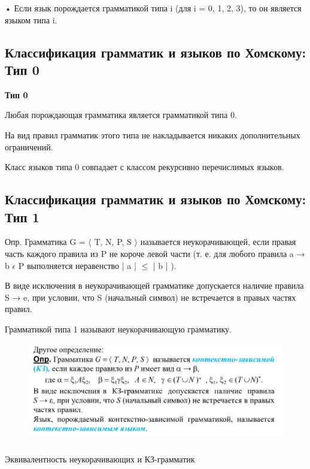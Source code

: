 \documentclass{article}
\begin{document}
• Если язык порождается грамматикой типа i (для i = 0, 1, 2,
3), то он является языком типа i.

\subsection{Классификация грамматик и языков по
Хомскому: Тип 0}

\textbf{Тип 0}

Любая порождающая грамматика является грамматикой
типа 0.

На вид правил грамматик этого типа не накладывается
никаких дополнительных ограничений.

Класс языков типа 0 совпадает с классом рекурсивно
перечислимых языков.

\subsection{Классификация грамматик и языков по
Хомскому: Тип 1}

Опр. Грамматика G = $\langle$ T, N, P, S $\rangle$ называется неукорачивающей, если
правая часть каждого правила из P не короче левой части (т. е. для
любого правила a → b $\epsilon$ P выполняется неравенство | a | $\leq$ | b | ).

В виде исключения в неукорачивающей грамматике допускается
наличие правила S → e, при условии, что S (начальный символ) не
встречается в правых частях правил.

Грамматикой типа 1 называют неукорачивающую грамматику.
\begin{figure}[H]
    \centering
    \includegraphics[width=1\linewidth]{Снимок экрана 2025-02-20 092937.png}
\end{figure}

\subsubsection{}{Эквивалентность неукорачивающих и
КЗ-грамматик}
\end{document}
